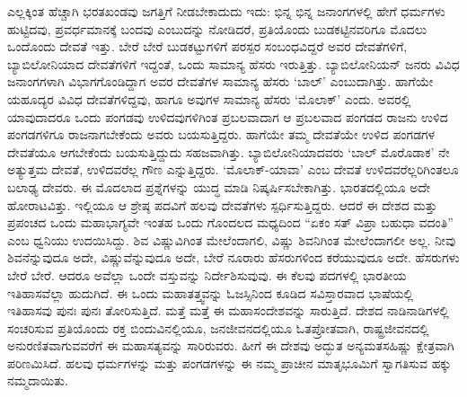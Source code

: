 ಎಲ್ಲಕ್ಕಿಂತ ಹೆಚ್ಚಾಗಿ ಭರತಖಂಡವು ಜಗತ್ತಿಗೆ ನೀಡಬೇಕಾದುದು ಇದು: ಭಿನ್ನ ಭಿನ್ನ ಜನಾಂಗಗಳಲ್ಲಿ ಹೇಗೆ ಧರ್ಮಗಳು ಹುಟ್ಟಿದವು, ಪ್ರವರ್ಧಮಾನಕ್ಕೆ ಬಂದವು ಎಂಬುದನ್ನು ನೋಡಿದರೆ, ಪ್ರತಿಯೊಂದು ಬುಡಕಟ್ಟಿನವರಿಗೂ ಮೊದಲು ಒಂದೊಂದು ದೇವತೆ ಇತ್ತು. ಬೇರೆ ಬೇರೆ ಬುಡಕಟ್ಟುಗಳಿಗೆ ಪರಸ್ಪರ ಸಂಬಂಧವಿದ್ದರೆ ಅವರ ದೇವತೆಗಳಿಗೆ, ಬ್ಯಾಬಿಲೋನಿಯಾದ ದೇವತೆಗಳಿಗೆ ಇದ್ದಂತೆ, ಒಂದು ಸಾಮಾನ್ಯ ಹೆಸರು ಇರುತ್ತಿತ್ತು. ಬ್ಯಾಬಿಲೋನಿಯನ್​ ಜನರು ವಿವಿಧ ಜನಾಂಗಗಳಾಗಿ ವಿಭಾಗಗೊಂಡಿದ್ದಾಗ ಅವರ ದೇವತೆಗಳ ಸಾಮಾನ್ಯ ಹೆಸರು ‘ಬಾಲ್​’ ಎಂಬುದಾಗಿತ್ತು. ಹಾಗೆಯೇ ಯಹೂದ್ಯರ ವಿವಿಧ ದೇವತೆಗಳಿದ್ದವು, ಹಾಗೂ ಅವುಗಳ ಸಾಮಾನ್ಯ ಹೆಸರು ‘ಮೊಲಾಕ್​’ ಎಂದು. ಅವರಲ್ಲಿ ಯಾವುದಾದರೂ ಒಂದು ಪಂಗಡವು ಉಳಿದವುಗಳಿಗಿಂತ ಪ್ರಬಲವಾದಾಗ ಆ ಪ್ರಬಲವಾದ ಪಂಗಡದ ರಾಜನು ಉಳಿದ ಪಂಗಡಗಳಿಗೂ ರಾಜನಾಗಬೇಕೆಂದು ಅವರು ಬಯಸುತ್ತಿದ್ದರು. ಹಾಗೆಯೇ ತಮ್ಮ ದೇವತೆಯೇ ಉಳಿದ ಪಂಗಡಗಳ ದೇವತೆಯೂ ಆಗಬೇಕೆಂದು ಬಯಸುತ್ತಿದ್ದುದು ಸಹಜವಾಗಿತ್ತು. ಬ್ಯಾಬಿಲೋನಿಯಾದವರು ‘ಬಾಲ್​ ಮೊರೊಡಾಕ’ ನೇ ಅತ್ಯುತ್ತಮ ದೇವತೆ, ಉಳಿದವರೆಲ್ಲ ಗೌಣ ಎನ್ನುತ್ತಿದ್ದರು. ‘ಮೊಲಾಕ್​-ಯಾವಾ’ ಎಂಬ ದೇವತೆ ಉಳಿದವರೆಲ್ಲರಿಗಿಂತಲೂ ಬಲಾಢ್ಯ ದೇವರು. ಈ ಮೊದಲಾದ ಪ್ರಶ್ನೆಗಳನ್ನು ಯುದ್ಧ ಮಾಡಿ ನಿಷ್ಕರ್ಷಿಸಬೇಕಾಗಿತ್ತು. ಭಾರತದಲ್ಲಿಯೂ ಅದೇ ಹೋರಾಟವಿತ್ತು. ಇಲ್ಲಿಯೂ ಆ ಶ್ರೇಷ್ಠ ಪದವಿಗೆ ಹಲವು ದೇವತೆಗಳು ಸ್ಪರ್ಧಿಸುತ್ತಿದ್ದರು. ಆದರೆ ಈ ದೇಶದ ಮತ್ತು ಪ್ರಪಂಚದ ಒಂದು ಮಹಾಭಾಗ್ಯವೇ ಇಂತಹ ಒಂದು ಗೊಂದಲದ ಮಧ್ಯದಿಂದ “ಏಕಂ ಸತ್​ ವಿಪ್ರಾ ಬಹುಧಾ ವದಂತಿ” ಎಂಬ ಧ್ವನಿಯು ಉದಯಿಸಿದ್ದು. ಶಿವ ವಿಷ್ಣುವಿಗಿಂತ ಮೇಲೆಂದಾಗಲಿ, ವಿಷ್ಣು ಶಿವನಿ\-ಗಿಂತ ಮೇಲೆಂದಾಗಲೀ ಅಲ್ಲ. ನೀವು ಶಿವನೆನ್ನುವುದೂ ಅದೇ, ವಿಷ್ಣುವೆನ್ನುವುದೂ ಅದೇ, ಬೇರೆ ನೂರಾರು ಹೆಸರುಗಳಿಂದ ಕರೆಯುವುದೂ ಅದೇ. ಹೆಸರುಗಳು ಬೇರೆ ಬೇರೆ. ಆದರೂ ಅವೆಲ್ಲಾ ಒಂದೇ ವಸ್ತುವನ್ನು ನಿರ್ದೇಶಿಸುವುವು. ಈ ಕೆಲವು ಪದಗಳಲ್ಲಿ ಭಾರತೀಯ ಇತಿಹಾಸವೆಲ್ಲಾ ಹುದುಗಿದೆ. ಈ ಒಂದು ಮಹಾತತ್ತ್ವವನ್ನು ಓಜಸ್ಸಿನಿಂದ ಕೂಡಿದ ಸವಿಸ್ತಾರವಾದ ಭಾಷೆಯಲ್ಲಿ ಇತಿಹಾಸವು ಪುನಃ ಪುನಃ ತೋರಿಸುತ್ತಿದೆ. ಮತ್ತೆ ಮತ್ತೆ ಈ ಮಹಾಸಂದೇಶವನ್ನು ಸಾರುತ್ತಿದೆ. ದೇಶದ ನಾಡಿನಾಡಿಗಳಲ್ಲಿ ಸಂಚರಿಸುವ ಪ್ರತಿಯೊಂದು ರಕ್ತ ಬಿಂದುವಿನಲ್ಲಿಯೂ, ಜನಜೀವನದಲ್ಲಿಯೂ ಓತಪ್ರೋತವಾಗಿ, ರಾಷ್ಟ್ರಜೀವನದಲ್ಲಿ ಅನುರಣಿತವಾಗುವವರೆಗೆ ಈ ಮಹಾಸತ್ಯವನ್ನು ಸಾರಿರುವರು. ಹೀಗೆ ಈ ದೇಶವು ಅದ್ಭುತ ಅನ್ಯಮತಸಹಿಷ್ಣು ಕ್ಷೇತ್ರವಾಗಿ ಪರಿಣಮಿಸಿದೆ. ಹಲವು ಧರ್ಮಗಳನ್ನು ಮತ್ತು ಪಂಗಡಗಳನ್ನು ಈ ನಮ್ಮ ಪ್ರಾಚೀನ ಮಾತೃಭೂಮಿಗೆ ಸ್ವಾಗತಿಸುವ ಹಕ್ಕು ನಮ್ಮ\-ದಾಯಿತು.

